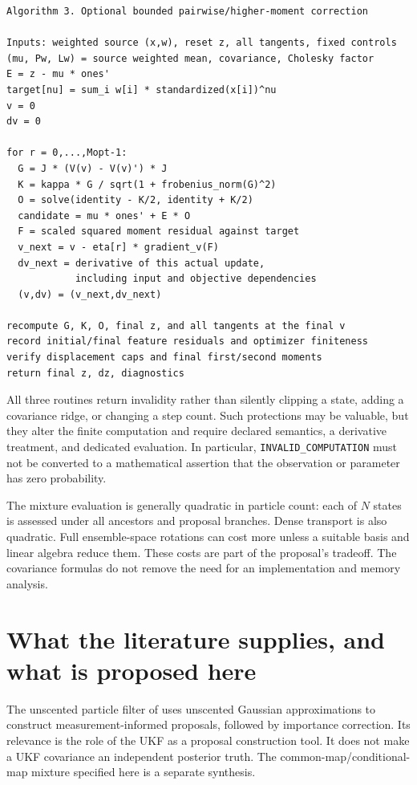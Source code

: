 \documentclass[11pt,a4paper]{article}
\begin{document}
\begin{minipage}{\linewidth}
\begin{lstlisting}
Algorithm 3. Optional bounded pairwise/higher-moment correction

Inputs: weighted source (x,w), reset z, all tangents, fixed controls
(mu, Pw, Lw) = source weighted mean, covariance, Cholesky factor
E = z - mu * ones'
target[nu] = sum_i w[i] * standardized(x[i])^nu
v = 0
dv = 0

for r = 0,...,Mopt-1:
  G = J * (V(v) - V(v)') * J
  K = kappa * G / sqrt(1 + frobenius_norm(G)^2)
  O = solve(identity - K/2, identity + K/2)
  candidate = mu * ones' + E * O
  F = scaled squared moment residual against target
  v_next = v - eta[r] * gradient_v(F)
  dv_next = derivative of this actual update,
            including input and objective dependencies
  (v,dv) = (v_next,dv_next)

recompute G, K, O, final z, and all tangents at the final v
record initial/final feature residuals and optimizer finiteness
verify displacement caps and final first/second moments
return final z, dz, diagnostics
\end{lstlisting}
\end{minipage}

All three routines return invalidity rather than silently clipping a state,
adding a covariance ridge, or changing a step count. Such protections may be
valuable, but they alter the finite computation and require declared
semantics, a derivative treatment, and dedicated evaluation. In particular,
\texttt{INVALID\_COMPUTATION} must not be converted to a mathematical assertion
that the observation or parameter has zero probability.

The mixture evaluation is generally quadratic in particle count: each of
\(N\) states is assessed under all ancestors and proposal branches.
Dense transport is also quadratic. Full ensemble-space rotations can cost
more unless a suitable basis and linear algebra reduce them. These costs
are part of the proposal's tradeoff. The covariance formulas do not remove
the need for an implementation and memory analysis.

\section{What the literature supplies, and what is proposed here}

The unscented particle filter of \citet{vandermerwe2000} uses unscented
Gaussian approximations to construct measurement-informed proposals,
followed by importance correction. Its relevance is the role of the UKF
as a proposal construction tool. It does not make a UKF covariance an
independent posterior truth. The common-map/conditional-map mixture
specified here is a separate synthesis.
\end{document}
